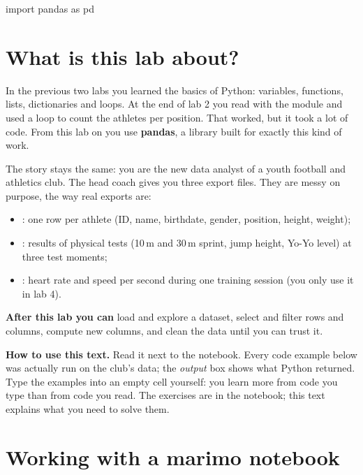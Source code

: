 \documentclass[11pt,a4paper]{article}
\author{dr. Maarten Slembrouck}
\begin{document}

\begin{python}[hide]
import pandas as pd
\end{python}

\section*{What is this lab about?}

In the previous two labs you learned the basics of Python: variables,
functions, lists, dictionaries and loops. At the end of lab 2 you read
 with the  module and used a 
loop to count the athletes per position. That worked, but it took a lot
of code. From this lab on you use \textbf{pandas}, a library built for
exactly this kind of work.

The story stays the same: you are the new data analyst of a youth
football and athletics club. The head coach gives you three export
files. They are messy on purpose, the way real exports are:

\begin{itemize}
  \item {}: one row per athlete (ID, name, birthdate,
        gender, position, height, weight);
  \item {}: results of physical tests (10\,m and 30\,m
        sprint, jump height, Yo-Yo level) at three test moments;
  \item {}: heart rate and speed per second during
        one training session (you only use it in lab 4).
\end{itemize}

\textbf{After this lab you can} load and explore a dataset, select and
filter rows and columns, compute new columns, and clean the data until
you can trust it.

\textbf{How to use this text.} Read it next to the notebook. Every code
example below was actually run on the club's data; the \emph{output}
box shows what Python returned. Type the examples into an empty cell
yourself: you learn more from code you type than from code you read.
The exercises are in the notebook; this text explains what you need to
solve them.

\section{Working with a marimo notebook}
\end{document}
